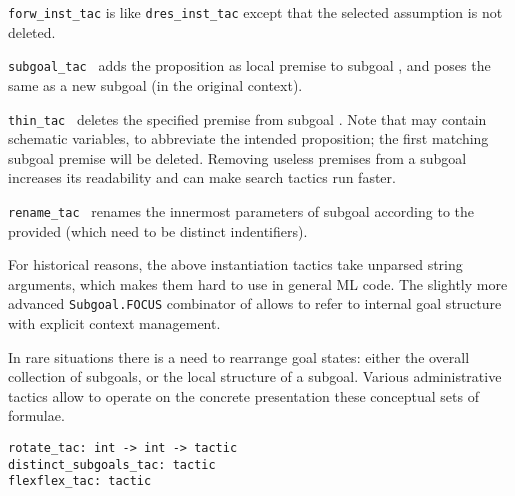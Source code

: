 \begin{isabellebody}
\begin{isamarkuptext}
\begin{description}
  \item \verb|forw_inst_tac| is like \verb|dres_inst_tac| except that
  the selected assumption is not deleted.

  \item \verb|subgoal_tac|~ adds the proposition
   as local premise to subgoal , and poses the
  same as a new subgoal  (in the original context).

  \item \verb|thin_tac|~ deletes the specified
  premise from subgoal .  Note that  may contain
  schematic variables, to abbreviate the intended proposition; the
  first matching subgoal premise will be deleted.  Removing useless
  premises from a subgoal increases its readability and can make
  search tactics run faster.

  \item \verb|rename_tac|~ renames the innermost
  parameters of subgoal  according to the provided  (which need to be distinct indentifiers).

  \end{description}

  For historical reasons, the above instantiation tactics take
  unparsed string arguments, which makes them hard to use in general
  ML code.  The slightly more advanced \verb|Subgoal.FOCUS| combinator
  of  allows to refer to internal goal
  structure with explicit context management.%
\end{isamarkuptext}%
\isamarkuptrue%
%
\endisatagmlref
{\isafoldmlref}%
%
\isadelimmlref
%
\endisadelimmlref
%
\isamarkuptrue%
%
\begin{isamarkuptext}%
In rare situations there is a need to rearrange goal states:
  either the overall collection of subgoals, or the local structure of
  a subgoal.  Various administrative tactics allow to operate on the
  concrete presentation these conceptual sets of formulae.%
\end{isamarkuptext}%
\isamarkuptrue%
%
\isadelimmlref
%
\endisadelimmlref
%
\isatagmlref
%
\begin{isamarkuptext}%
\begin{mldecls}
  \verb|rotate_tac: int -> int -> tactic| \\
  \verb|distinct_subgoals_tac: tactic| \\
  \verb|flexflex_tac: tactic| \\
  \end{mldecls}


\end{isamarkuptext}
\end{isabellebody}
